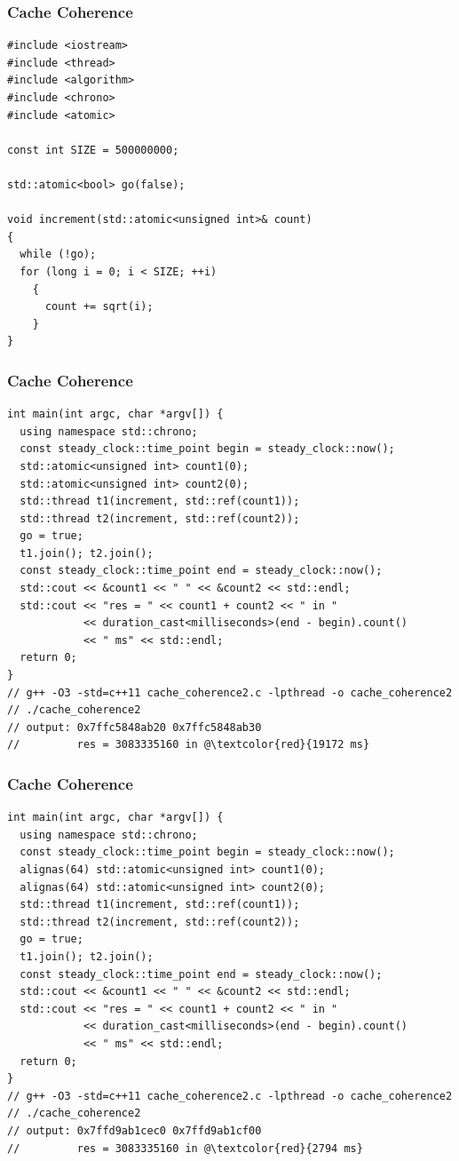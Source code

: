 \documentclass{beamer}
\begin{document}
\begin{frame}[fragile]
\frametitle{Cache Coherence}
\scriptsize

\begin{lstlisting}[linebackgroundcolor={\lstcolorlines{11}}]
#include <iostream>
#include <thread>
#include <algorithm>
#include <chrono>
#include <atomic>

const int SIZE = 500000000;

std::atomic<bool> go(false);

void increment(std::atomic<unsigned int>& count)
{
  while (!go);
  for (long i = 0; i < SIZE; ++i)
    {
      count += sqrt(i);
    }
}
\end{lstlisting}

\end{frame}

\begin{frame}[fragile]
\frametitle{Cache Coherence}
\scriptsize

\begin{lstlisting}[linebackgroundcolor={\lstcolorlines{4,5}}]
int main(int argc, char *argv[]) {
  using namespace std::chrono;
  const steady_clock::time_point begin = steady_clock::now();
  std::atomic<unsigned int> count1(0);
  std::atomic<unsigned int> count2(0);
  std::thread t1(increment, std::ref(count1));
  std::thread t2(increment, std::ref(count2));
  go = true;
  t1.join(); t2.join();
  const steady_clock::time_point end = steady_clock::now();
  std::cout << &count1 << " " << &count2 << std::endl;
  std::cout << "res = " << count1 + count2 << " in "
            << duration_cast<milliseconds>(end - begin).count()
            << " ms" << std::endl;
  return 0;
}
// g++ -O3 -std=c++11 cache_coherence2.c -lpthread -o cache_coherence2
// ./cache_coherence2
// output: 0x7ffc5848ab20 0x7ffc5848ab30
//         res = 3083335160 in @\textcolor{red}{19172 ms}
\end{lstlisting}

\end{frame}

\begin{frame}[fragile]
\frametitle{Cache Coherence}
\scriptsize

\begin{lstlisting}[linebackgroundcolor={\lstcolorlines{4,5}}]
int main(int argc, char *argv[]) {
  using namespace std::chrono;
  const steady_clock::time_point begin = steady_clock::now();
  alignas(64) std::atomic<unsigned int> count1(0);
  alignas(64) std::atomic<unsigned int> count2(0);
  std::thread t1(increment, std::ref(count1));
  std::thread t2(increment, std::ref(count2));
  go = true;
  t1.join(); t2.join();
  const steady_clock::time_point end = steady_clock::now();
  std::cout << &count1 << " " << &count2 << std::endl;
  std::cout << "res = " << count1 + count2 << " in "
            << duration_cast<milliseconds>(end - begin).count()
            << " ms" << std::endl;
  return 0;
}
// g++ -O3 -std=c++11 cache_coherence2.c -lpthread -o cache_coherence2
// ./cache_coherence2
// output: 0x7ffd9ab1cec0 0x7ffd9ab1cf00
//         res = 3083335160 in @\textcolor{red}{2794 ms}
\end{lstlisting}

\end{frame}
\end{document}
